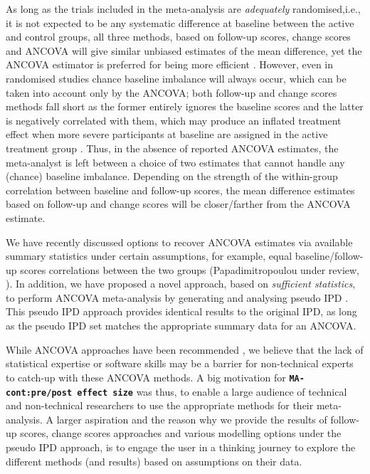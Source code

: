 \documentclass[AMA,STIX1COL]{WileyNJD-v2}
\begin{document}
As long as the trials included in the meta-analysis are \textit{adequately} randomised,i.e., it is not expected to be any systematic difference at baseline between the active and control groups, all three methods, based on follow-up scores, change scores and ANCOVA will give similar unbiased estimates of the mean difference, yet the ANCOVA estimator is preferred for being more efficient \citep{senn2006change, fu2013handling, senn2013seven, senn2014baseline}. However, even in randomised studies chance baseline imbalance will always occur, which can be taken into account only by the ANCOVA; both follow-up and change scores methods fall short as the former entirely ignores the baseline scores and the latter is negatively correlated with them, which may produce an inflated treatment effect when more severe participants at baseline are assigned in the active treatment group \citep{vickers2001analysing}. Thus, in the absence of reported ANCOVA estimates, the meta-analyst is left between a choice of two estimates that cannot handle any (chance) baseline imbalance. Depending on the strength of the within-group correlation between baseline and follow-up scores, the mean difference estimates based on follow-up and change scores will be closer/farther from the ANCOVA estimate.

We have recently discussed options to recover ANCOVA estimates via available summary statistics under certain assumptions, for example, equal baseline/follow-up scores correlations between the two groups (Papadimitropoulou under review, \cite{senn2006change, mckenzie2016impact}). In addition, we have proposed a novel approach, based on \textit{sufficient statistics}, to perform ANCOVA meta-analysis by generating and analysing pseudo IPD \citep{papadimitropoulou2020meta}. This pseudo IPD approach provides identical results to the original IPD, as long as the pseudo IPD set matches the appropriate summary data for an ANCOVA.

While ANCOVA approaches have been recommended \citep{fu2013handling, daly2021nice}, we believe that the lack of statistical expertise or software skills may be a barrier for non-technical experts to catch-up with these ANCOVA methods. A big motivation for \textbf{\texttt{MA-cont:pre/post effect size}} was thus, to enable a large audience of technical and non-technical researchers to use the appropriate methods for their meta-analysis. A larger aspiration and the reason why we provide the results of follow-up scores, change scores approaches and various modelling options under the pseudo IPD approach, is to engage the user in a thinking journey to explore the different methods (and results) based on assumptions on their data.
\end{document}
